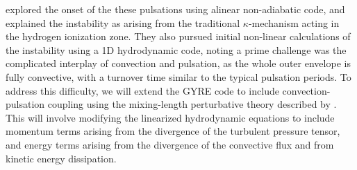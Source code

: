 \citet{1997AampA...327..224H} explored the onset of the these pulsations using alinear non-adiabatic code, and explained the instability  as arising from the traditional $\kappa$-mechanism acting in the hydrogen ionization zone. They also pursued initial
non-linear calculations of the instability using a 1D hydrodynamic code, noting a prime challenge was the complicated interplay of convection and pulsation, as the whole outer envelope is fully convective, with a turnover time similar to the typical pulsation periods. To address this difficulty, we will extend the GYRE code to include convection-pulsation coupling using the mixing-length perturbative theory described by \citet{Grigahcene:2005}. This will involve modifying the linearized hydrodynamic equations to include momentum terms arising from the divergence of the turbulent pressure tensor, and energy terms arising from the divergence of the convective flux and from kinetic energy dissipation.